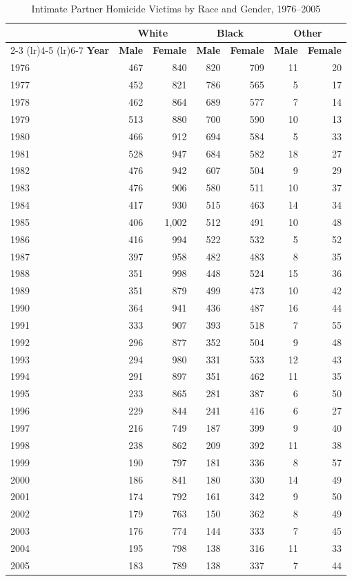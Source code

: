 \documentclass[12pt, letterpaper]{article}
\begin{document}
\begin{table}[H]
\centering
\caption{Intimate Partner Homicide Victims by Race and Gender, 1976--2005}
\label{tab:iph_race_gender}
\small
\begin{tabular}{l*{6}{r}}
\toprule
& \multicolumn{2}{c}{\textbf{White}} & \multicolumn{2}{c}{\textbf{Black}} & \multicolumn{2}{c}{\textbf{Other}} \\
\cmidrule(lr){2-3} \cmidrule(lr){4-5} \cmidrule(lr){6-7}
\textbf{Year} & \textbf{Male} & \textbf{Female} & \textbf{Male} & \textbf{Female} & \textbf{Male} & \textbf{Female} \\
\midrule
1976 & 467 & 840 & 820 & 709 & 11 & 20 \\
1977 & 452 & 821 & 786 & 565 & 5 & 17 \\
1978 & 462 & 864 & 689 & 577 & 7 & 14 \\
1979 & 513 & 880 & 700 & 590 & 10 & 13 \\
1980 & 466 & 912 & 694 & 584 & 5 & 33 \\
1981 & 528 & 947 & 684 & 582 & 18 & 27 \\
1982 & 476 & 942 & 607 & 504 & 9 & 29 \\
1983 & 476 & 906 & 580 & 511 & 10 & 37 \\
1984 & 417 & 930 & 515 & 463 & 14 & 34 \\
1985 & 406 & 1,002 & 512 & 491 & 10 & 48 \\
1986 & 416 & 994 & 522 & 532 & 5 & 52 \\
1987 & 397 & 958 & 482 & 483 & 8 & 35 \\
1988 & 351 & 998 & 448 & 524 & 15 & 36 \\
1989 & 351 & 879 & 499 & 473 & 10 & 42 \\
1990 & 364 & 941 & 436 & 487 & 16 & 44 \\
1991 & 333 & 907 & 393 & 518 & 7 & 55 \\
1992 & 296 & 877 & 352 & 504 & 9 & 48 \\
1993 & 294 & 980 & 331 & 533 & 12 & 43 \\
1994 & 291 & 897 & 351 & 462 & 11 & 35 \\
1995 & 233 & 865 & 281 & 387 & 6 & 50 \\
1996 & 229 & 844 & 241 & 416 & 6 & 27 \\
1997 & 216 & 749 & 187 & 399 & 9 & 40 \\
1998 & 238 & 862 & 209 & 392 & 11 & 38 \\
1999 & 190 & 797 & 181 & 336 & 8 & 57 \\
2000 & 186 & 841 & 180 & 330 & 14 & 49 \\
2001 & 174 & 792 & 161 & 342 & 9 & 50 \\
2002 & 179 & 763 & 150 & 362 & 8 & 49 \\
2003 & 176 & 774 & 144 & 333 & 7 & 45 \\
2004 & 195 & 798 & 138 & 316 & 11 & 33 \\
2005 & 183 & 789 & 138 & 337 & 7 & 44 \\
\bottomrule
\end{tabular}
\vspace{0.5em}


\end{table}
\end{document}

